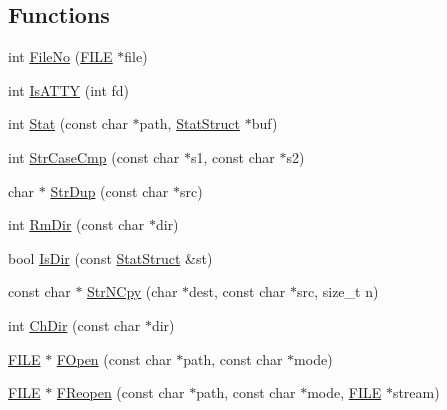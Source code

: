 \subsection*{Functions}
\begin{DoxyCompactItemize}
\item 
int \hyperlink{namespacetesting_1_1internal_1_1posix_a3117b067e1f942a2031e666953120ccc}{File\+No} (\hyperlink{gmock__output__test__golden_8txt_ab12dc6c67167ae2f0af132bdd8c2955e}{F\+I\+LE} $\ast$file)
\item 
int \hyperlink{namespacetesting_1_1internal_1_1posix_a16ebe936b3a8ea462a94191635aedc27}{Is\+A\+T\+TY} (int fd)
\item 
int \hyperlink{namespacetesting_1_1internal_1_1posix_a2b87b7ff647a128614daf50667eb9304}{Stat} (const char $\ast$path, \hyperlink{namespacetesting_1_1internal_1_1posix_a8eb9f08d3af29941c2d2a964cfff3ecb}{Stat\+Struct} $\ast$buf)
\item 
int \hyperlink{namespacetesting_1_1internal_1_1posix_a1ef2385a7f8e4c706054da35967e76bd}{Str\+Case\+Cmp} (const char $\ast$s1, const char $\ast$s2)
\item 
char $\ast$ \hyperlink{namespacetesting_1_1internal_1_1posix_a8e352884793a65ae8be144676f1a9136}{Str\+Dup} (const char $\ast$src)
\item 
int \hyperlink{namespacetesting_1_1internal_1_1posix_acbad5d4ea5b73fd1765f5f760642932a}{Rm\+Dir} (const char $\ast$dir)
\item 
bool \hyperlink{namespacetesting_1_1internal_1_1posix_af0d04ed5baeed28353fa38742748a421}{Is\+Dir} (const \hyperlink{namespacetesting_1_1internal_1_1posix_a8eb9f08d3af29941c2d2a964cfff3ecb}{Stat\+Struct} \&st)
\item 
const char $\ast$ \hyperlink{namespacetesting_1_1internal_1_1posix_a36fca815713332e5c6dc92c98b6b2574}{Str\+N\+Cpy} (char $\ast$dest, const char $\ast$src, size\+\_\+t n)
\item 
int \hyperlink{namespacetesting_1_1internal_1_1posix_a1ddc8a4fc6bb21da372307485591a212}{Ch\+Dir} (const char $\ast$dir)
\item 
\hyperlink{gmock__output__test__golden_8txt_ab12dc6c67167ae2f0af132bdd8c2955e}{F\+I\+LE} $\ast$ \hyperlink{namespacetesting_1_1internal_1_1posix_a4042201dcc4932641d484e7ddf94de7d}{F\+Open} (const char $\ast$path, const char $\ast$mode)
\item 
\hyperlink{gmock__output__test__golden_8txt_ab12dc6c67167ae2f0af132bdd8c2955e}{F\+I\+LE} $\ast$ \hyperlink{namespacetesting_1_1internal_1_1posix_a9ef6d089cdae03f9d9e0e6d379c40703}{F\+Reopen} (const char $\ast$path, const char $\ast$mode, \hyperlink{gmock__output__test__golden_8txt_ab12dc6c67167ae2f0af132bdd8c2955e}{F\+I\+LE} $\ast$stream)

\end{DoxyCompactItemize}
